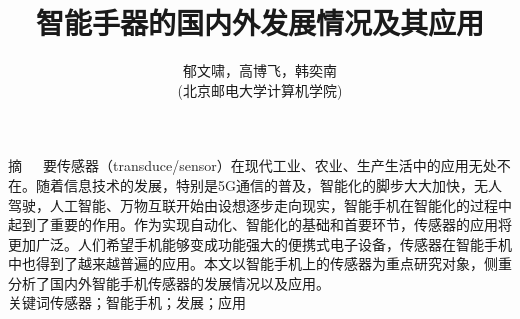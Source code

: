 \documentclass[a4paper,11pt,onecolumn,twoside]{article}
\title{\huge{智能手器的国内外发展情况及其应用}}
\author{郁文啸，高博飞，韩奕南\\[2pt]
\normalsize
(北京邮电大学计算机学院)\\[2pt]}
\date{}
\begin{document}
\newcommand{\ccr}[1]{\makecell{{\color{#1}\rule{1cm}{1cm}}}}

\maketitle

\setlength{\oddsidemargin}{ 1cm}  %
\setlength{\evensidemargin}{\oddsidemargin}
\setlength{\textwidth}{13.50cm}
\vspace{-.8cm}


\begin{center}
\parbox{\textwidth}{
摘~~~要\quad {}传感器（transduce/sensor）在现代工业、农业、生产生活中的应用无处不在。随着信息技术的发展，特别是5G通信的普及，智能化的脚步大大加快，无人驾驶，人工智能、万物互联开始由设想逐步走向现实，智能手机在智能化的过程中起到了重要的作用。作为实现自动化、智能化的基础和首要环节，传感器的应用将更加广泛。人们希望手机能够变成功能强大的便携式电子设备，传感器在智能手机中也得到了越来越普遍的应用。本文以智能手机上的传感器为重点研究对象，侧重分析了国内外智能手机传感器的发展情况以及应用。\\
关键词\quad{}传感器；智能手机；发展；应用
}
\end{center}

\setlength{\oddsidemargin}{-.5cm}  %
\setlength{\evensidemargin}{\oddsidemargin}
\setlength{\textwidth}{17.00cm}
\end{document}
